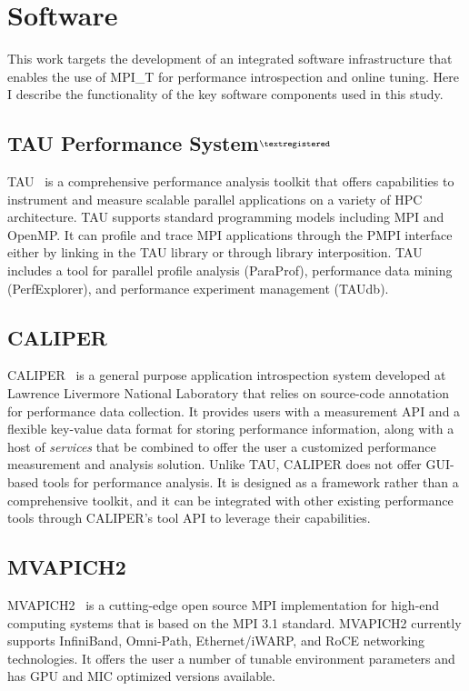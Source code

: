 \section {Software}
This work targets the development of an integrated software infrastructure that enables the use of MPI\_T for performance introspection and online tuning. Here I describe the functionality of the key software components used in this study.
\subsection{TAU Performance System$^{\textregistered}$}
TAU~\cite{Shende:2006:TPP:1125980.1125982} is a comprehensive performance analysis toolkit that offers capabilities to instrument and measure scalable parallel applications on a variety of HPC architecture.
TAU supports standard programming models including MPI and OpenMP. It can profile and trace MPI applications through the PMPI interface either by linking in the TAU library or through library interposition.
TAU includes a tool for parallel profile analysis (ParaProf), performance data mining (PerfExplorer), and performance experiment management (TAUdb).

\subsection {CALIPER}
CALIPER~\cite{CALIPER} is a general purpose application introspection system developed at Lawrence Livermore National Laboratory that relies on source-code annotation for performance data collection. It provides users with a measurement API and a flexible key-value data format for storing performance information, along with a host of \textit{services} that be combined to offer the user a customized performance measurement and analysis solution. Unlike TAU, CALIPER does not offer GUI-based tools for performance analysis. It is designed as a framework rather than a comprehensive toolkit, and it can be integrated with other existing performance tools through CALIPER's tool API to leverage their capabilities.

\subsection{MVAPICH2}
MVAPICH2~\cite{MVAPICH2} is a cutting-edge open source MPI implementation for high-end computing systems that is based on the MPI 3.1 standard. MVAPICH2 currently supports InfiniBand, Omni-Path, Ethernet/iWARP, and RoCE networking technologies. It offers the user a number of tunable environment parameters and has GPU and MIC optimized versions available.

